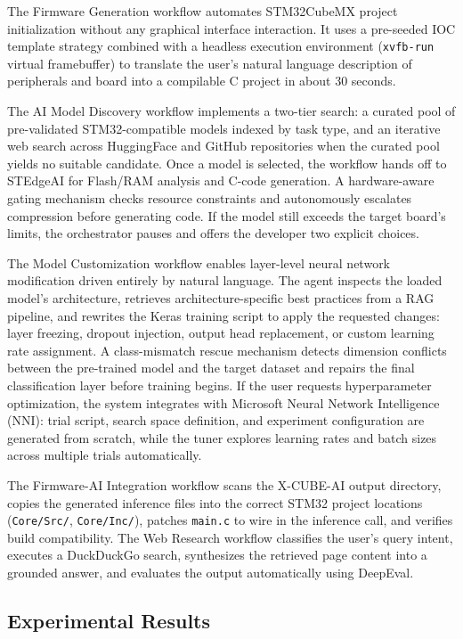 \documentclass[11pt]{article}
\begin{document}
The Firmware Generation workflow automates STM32CubeMX project initialization without any graphical interface interaction. It uses a pre-seeded IOC template strategy combined with a headless execution environment (\texttt{xvfb-run} virtual framebuffer) to translate the user's natural language description of peripherals and board into a compilable C project in about 30 seconds.

The AI Model Discovery workflow implements a two-tier search: a curated pool of pre-validated STM32-compatible models indexed by task type, and an iterative web search across HuggingFace and GitHub repositories when the curated pool yields no suitable candidate. Once a model is selected, the workflow hands off to STEdgeAI for Flash/RAM analysis and C-code generation. A hardware-aware gating mechanism checks resource constraints and autonomously escalates compression before generating code. If the model still exceeds the target board's limits, the orchestrator pauses and offers the developer two explicit choices.

The Model Customization workflow enables layer-level neural network modification driven entirely by natural language. The agent inspects the loaded model's architecture, retrieves architecture-specific best practices from a RAG pipeline, and rewrites the Keras training script to apply the requested changes: layer freezing, dropout injection, output head replacement, or custom learning rate assignment. A class-mismatch rescue mechanism detects dimension conflicts between the pre-trained model and the target dataset and repairs the final classification layer before training begins. If the user requests hyperparameter optimization, the system integrates with Microsoft Neural Network Intelligence (NNI): trial script, search space definition, and experiment configuration are generated from scratch, while the tuner explores learning rates and batch sizes across multiple trials automatically.

The Firmware-AI Integration workflow scans the X-CUBE-AI output directory, copies the generated inference files into the correct STM32 project locations (\texttt{Core/Src/}, \texttt{Core/Inc/}), patches \texttt{main.c} to wire in the inference call, and verifies build compatibility. The Web Research workflow classifies the user's query intent, executes a DuckDuckGo search, synthesizes the retrieved page content into a grounded answer, and evaluates the output automatically using DeepEval.



\subsection*{Experimental Results}
\end{document}
